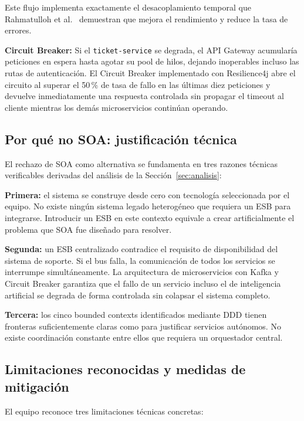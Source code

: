 \documentclass[12pt, a4paper]{article}
\begin{document}
\newpage
Este flujo implementa exactamente el desacoplamiento temporal que
Rahmatulloh et al.~\cite{rahmatulloh2022} demuestran que mejora el rendimiento y
reduce la tasa de errores.

\textbf{Circuit Breaker:} Si el \texttt{ticket-service} se degrada, el API Gateway
acumularía peticiones en espera hasta agotar su pool de hilos, dejando inoperables
incluso las rutas de autenticación. El Circuit Breaker implementado con Resilience4j
abre el circuito al superar el 50\,\% de tasa de fallo en las últimas diez
peticiones y devuelve inmediatamente una respuesta controlada sin propagar el
timeout al cliente mientras los demás microservicios continúan operando.

\subsection{Por qué no SOA: justificación técnica}

El rechazo de SOA como alternativa se fundamenta en tres razones técnicas
verificables derivadas del análisis de la Sección~\ref{sec:analisis}:

\textbf{Primera:} el sistema se construye desde cero con tecnología seleccionada
por el equipo. No existe ningún sistema legado heterogéneo que requiera un ESB
para integrarse. Introducir un ESB en este contexto equivale a crear artificialmente
el problema que SOA fue diseñado para resolver.

\textbf{Segunda:} un ESB centralizado contradice el requisito de disponibilidad
del sistema de soporte. Si el bus falla, la comunicación de todos los servicios
se interrumpe simultáneamente. La arquitectura de microservicios con Kafka y
Circuit Breaker garantiza que el fallo de un servicio incluso el de inteligencia
artificial se degrada de forma controlada sin colapsar el sistema completo.

\textbf{Tercera:} los cinco bounded contexts identificados mediante DDD tienen
fronteras suficientemente claras como para justificar servicios autónomos. No
existe coordinación constante entre ellos que requiera un orquestador central.

\subsection{Limitaciones reconocidas y medidas de mitigación}

El equipo reconoce tres limitaciones técnicas concretas:
\end{document}
